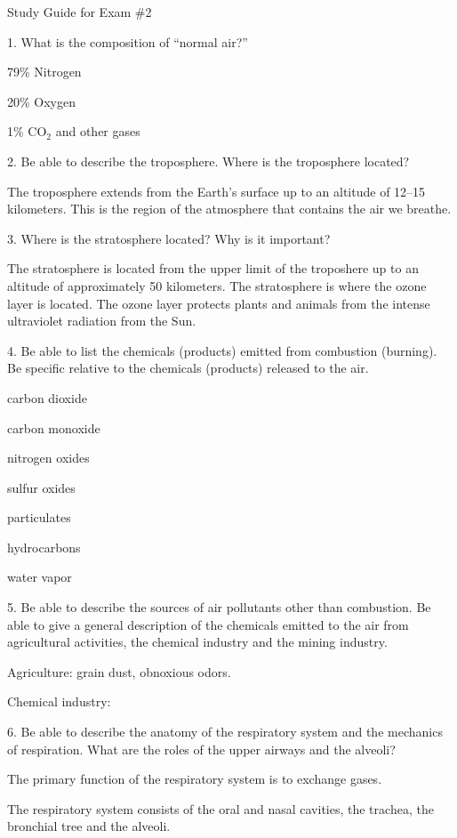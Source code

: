\beginsection Study Guide for Exam \#2


\bigskip
\item{1.} What is the composition of ``normal air?''
\item{} 79\% Nitrogen
\item{}20\% Oxygen
\item{}1\% CO${}_2$ and other gases

\bigskip
\item{2.} Be able to describe the troposphere.
Where is the troposphere located?

\item{} The troposphere extends from the Earth's surface
up to an altitude of 12--15 kilometers.
This is the region of the atmosphere that contains the air we breathe.

\bigskip
\item{3.} Where is the stratosphere located? Why is it important?
\item{} The stratosphere is located from the upper limit of
the troposhere up to an altitude of approximately 50 kilometers.
The stratosphere is where the ozone layer is located.
The ozone layer protects plants and animals from the
intense ultraviolet radiation from the Sun.

\bigskip
\item{4.} Be able to list the chemicals (products) emitted from
combustion (burning).
Be specific relative to the chemicals (products) released to the air.
\item{} carbon dioxide
\item{} carbon monoxide
\item{} nitrogen oxides
\item{} sulfur oxides
\item{} particulates
\item{} hydrocarbons
\item{} water vapor

\bigskip
\item{5.} Be able to describe the sources of air pollutants other
than combustion. Be able to give a general description of the chemicals
emitted to the air from agricultural activities, the chemical
industry and the mining industry.
\item{} Agriculture: grain dust, obnoxious odors.
\item{} Chemical industry:

\bigskip
\item{6.} Be able to describe the anatomy of the respiratory system
and the mechanics of respiration.
What are the roles of the upper airways and the alveoli?
\item{} The primary function of the respiratory system is to exchange gases.
\item{} The respiratory system consists of the oral and nasal cavities,
the trachea, the bronchial tree and the alveoli.

